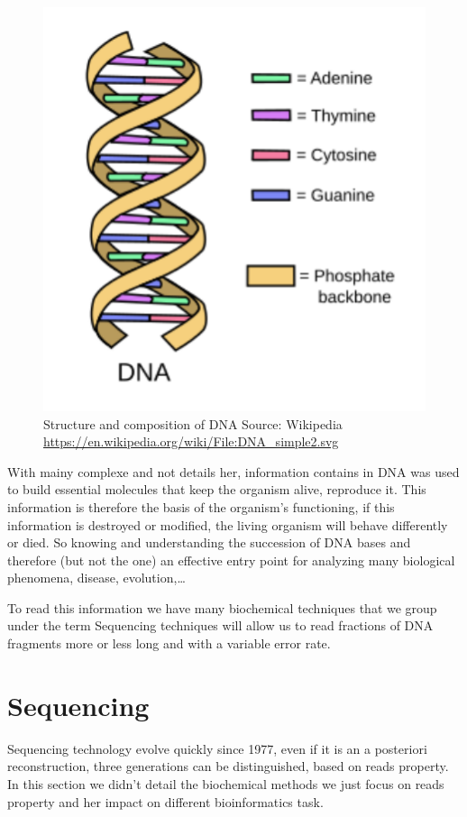 \documentclass[./main.tex]{subfiles}
\begin{document}
\begin{figure}[ht]
    \centering
    \includegraphics[]{introduction/images/DNA.pdf}
    \caption{Structure and composition of DNA Source: Wikipedia \protect\url{https://en.wikipedia.org/wiki/File:DNA_simple2.svg}}
    \label{intro:fig:dna_rna_pres}
\end{figure}

With mainy complexe and not details her, information contains in DNA was used to build essential molecules that keep the organism alive, reproduce it. This information is therefore the basis of the organism's functioning, if this information is destroyed or modified, the living organism will behave differently or died. So knowing and understanding the succession of DNA bases and therefore (but not the one) an effective entry point for analyzing many biological phenomena, disease, evolution,…

To read this information we have many biochemical techniques that we group under the term Sequencing techniques will allow us to read fractions of DNA fragments more or less long and with a variable error rate.

\section{Sequencing} \label{section:introduction:sequencing}

Sequencing technology evolve quickly since 1977\cite{sanger_sequencing}, even if it is an a posteriori reconstruction, three generations can be distinguished, based on reads property. In this section we didn't detail the biochemical methods we just focus on reads property and her impact on different bioinformatics task.
\end{document}
